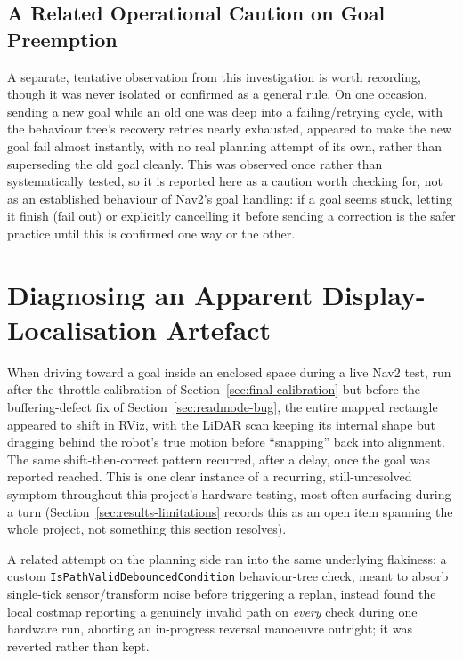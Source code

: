 \subsection{A Related Operational Caution on Goal Preemption}
\label{sec:goal-preemption-caution}

A separate, tentative observation from this investigation is worth
recording, though it was never isolated or confirmed as a general
rule. On one occasion, sending a new goal while an old one was deep
into a failing/retrying cycle, with the behaviour tree's recovery
retries nearly exhausted, appeared to make the new goal fail almost
instantly, with no real planning attempt of its own, rather than
superseding the old goal cleanly. This was observed once rather than
systematically tested, so it is reported here as a caution worth
checking for, not as an established behaviour of Nav2's goal
handling: if a goal seems stuck, letting it finish (fail out) or
explicitly cancelling it before sending a correction is the safer
practice until this is confirmed one way or the other.

\section{Diagnosing an Apparent Display-Localisation Artefact}
\label{sec:display-lag}

When driving toward a goal inside an enclosed space during a live
Nav2 test, run after the throttle calibration of
Section~\ref{sec:final-calibration} but before the buffering-defect
fix of Section~\ref{sec:readmode-bug}, the entire mapped rectangle
appeared to shift in RViz, with the LiDAR scan keeping its internal
shape but dragging behind the robot's true motion before ``snapping''
back into alignment. The same shift-then-correct pattern recurred,
after a delay, once the goal was reported reached. This is one clear
instance of a recurring, still-unresolved symptom throughout this
project's hardware testing, most often surfacing during a turn
(Section~\ref{sec:results-limitations} records this as an open item
spanning the whole project, not something this section resolves).

A related attempt on the planning side ran into the same underlying
flakiness: a custom \texttt{IsPathValidDebouncedCondition}
behaviour-tree check, meant to absorb single-tick sensor/transform
noise before triggering a replan, instead found the local costmap
reporting a genuinely invalid path on \emph{every} check during one
hardware run, aborting an in-progress reversal manoeuvre outright; it
was reverted rather than kept.\label{sec:ispathvalid-reverted}

